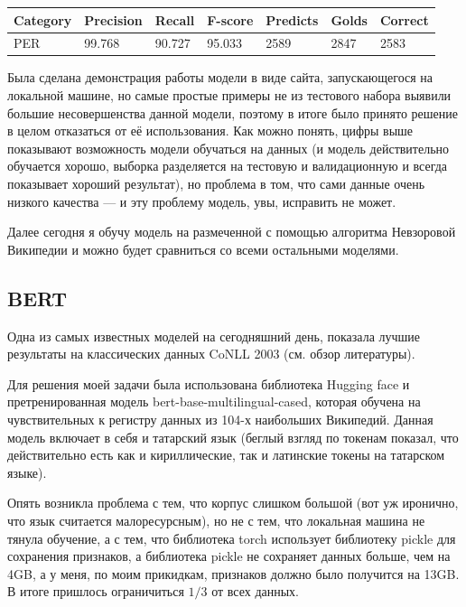 \begin{tabular}{| l | l | l | l | l | l | l |}
\hline
Category               & Precision  &   Recall   &  F-score   &  Predicts  &   Golds    &  Correct   \\

\hline
 PER                                 & 99.768     & 90.727     & 95.033     & 2589       & 2847       & 2583       \\
\hline
\end{tabular}


Была сделана демонстрация работы модели в виде сайта, запускающегося на локальной машине, но самые простые примеры не из тестового набора выявили большие несовершенства данной модели, поэтому в итоге было принято решение в целом отказаться от её использования. Как можно понять, цифры выше показывают возможность модели обучаться на данных (и модель действительно обучается хорошо, выборка разделяется на тестовую и валидационную и всегда показывает хороший результат), но проблема в том, что сами данные очень низкого качества --- и эту проблему модель, увы, исправить не может.


Далее сегодня я обучу модель на размеченной с помощью алгоритма Невзоровой Википедии и можно будет сравниться со всеми остальными моделями.


\subsection{BERT}

\cite{DBLP:journals/corr/abs-1810-04805} Одна из самых известных моделей на сегодняшний день, показала лучшие результаты на классических данных CoNLL 2003 (см. обзор литературы).

Для решения моей задачи была использована библиотека Hugging face \cite{Wolf2019HuggingFacesTS} и претренированная модель bert-base-multilingual-cased, которая обучена на чувствительных к регистру данных из 104-х наибольших Википедий. Данная модель включает в себя и татарский язык (беглый взгляд по токенам показал, что действительно есть как и кириллические, так и латинские токены на татарском языке). 

Опять возникла проблема с тем, что корпус слишком большой (вот уж иронично, что язык считается малоресурсным), но не с тем, что локальная машина не тянула обучение, а с тем, что библиотека torch использует библиотеку pickle для сохранения признаков, а библиотека pickle не сохраняет данных больше, чем на 4GB, а у меня, по моим прикидкам, признаков должно было получится на 13GB. В итоге пришлось ограничиться $1/3$ от всех данных. 

